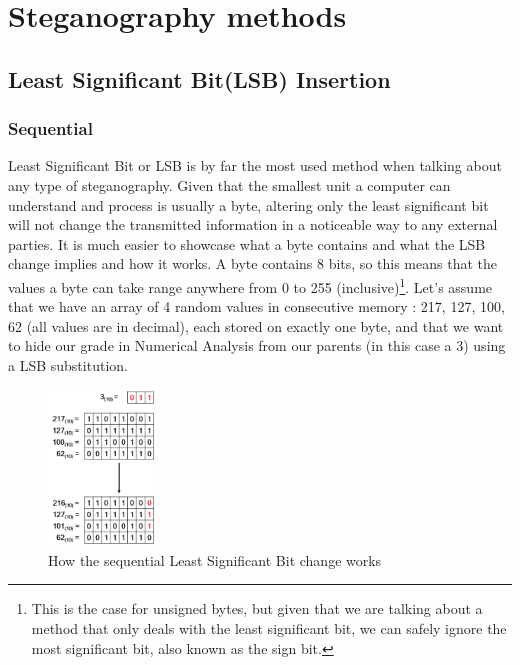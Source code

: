 
\chapter{Steganography methods}


\section{Least Significant Bit(LSB) Insertion} \label{lsb_insertion_chapter}
\begin{multicols*}{2}
\subsection{Sequential}
\setlength\columnsep{20pt}

Least Significant Bit or LSB is by far the most used method when talking about any type of steganography. Given that the smallest unit a computer can understand and process is usually a byte, altering only the least significant bit will not change the transmitted information in a noticeable way to any external parties. It is much easier to showcase what a byte contains and what the LSB change implies and how it works. A byte contains 8 bits, so this means that the values a byte can take range anywhere from 0 to 255 (inclusive)\footnote{This is the case for unsigned bytes, but given that we are talking about a method that only deals with the least significant bit, we can safely ignore the most significant bit, also known as the sign bit.}. Let's assume that we have an array of 4 random values in consecutive memory : 217, 127, 100, 62 (all values are in decimal), each stored on exactly one byte, and that we want to hide our grade in Numerical Analysis from our parents (in this case a 3) using a LSB substitution.
\begin{figure}[H]
    \centering
    \includegraphics[width=2.8cm,keepaspectratio]{pics/how_lsb_works}
    \caption{How the sequential Least Significant Bit change works}
    \label{LSB}
\end{figure}


\end{multicols*}
